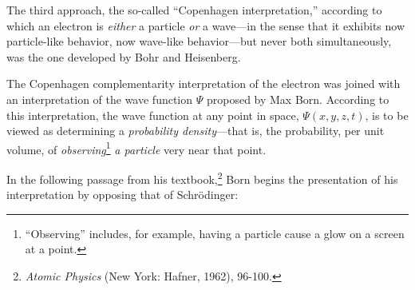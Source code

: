The third approach, the so-called ``Copenhagen interpretation,''
according to which an electron is \emph{either} a particle \emph{or} a
wave---in the sense that it exhibits now particle-like behavior, now
wave-like behavior---but never both simultaneously, was the one
developed by Bohr and Heisenberg.

The Copenhagen complementarity interpretation of the electron was joined
with an interpretation of the wave function $\Psi$ proposed by Max
Born. According to this interpretation, the wave function at any point
in space, $\Psi(x,y,z,t)$, is to be viewed as determining a
\emph{probability density}---that is, the probability, per unit volume,
of \emph{observing}\footnote{``Observing'' includes, for example, having
  a particle cause a glow on a screen at a point.} \emph{a particle}
very near that point.

In the following passage from his textbook,\footnote{\emph{Atomic
  Physics} (New York: Hafner, 1962), 96-100.} Born begins the
presentation of his interpretation by opposing that of Schrödinger:

